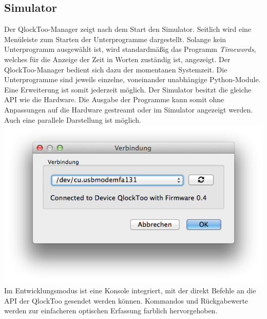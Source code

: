 \begin{multicols}{2}
\subsection*{Simulator}
Der QlockToo-Manager zeigt nach dem Start den Simulator. Seitlich wird eine Menüleiste zum Starten der Unterprogramme dargestellt.
Solange kein Unterprogramm ausgewählt ist, wird standardmäßig das Programm \emph{Timewords}, welches für die Anzeige der Zeit in Worten zuständig ist, angezeigt. Der QlockToo-Manager bedient sich dazu der momentanen Systemzeit.
Die Unterprogramme sind jeweils einzelne, voneinander unabhängige Python-Module. Eine Erweiterung ist somit jederzeit möglich.
Der Simulator besitzt die gleiche API wie die Hardware. Die Ausgabe der Programme kann somit ohne Anpassungen auf die Hardware gestreamt oder im Simulator angezeigt werden. Auch eine parallele Darstellung ist möglich.
\includegraphics[width=\columnwidth]{Abbildungen/Software/ConnectDialog}
Im Entwicklungsmodus ist eine Konsole integriert, mit der direkt Befehle an die API der QlockToo gesendet werden können. Kommandos und Rückgabewerte werden zur einfacheren optischen Erfassung farblich hervorgehoben.

\end{multicols}
